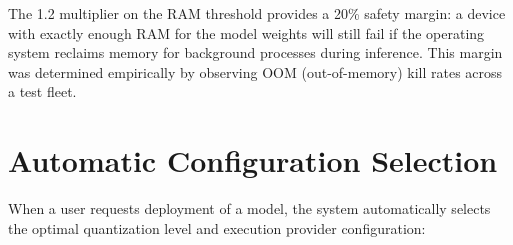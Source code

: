 \documentclass[12pt, letterpaper, twoside]{report}
\begin{document}
The 1.2 multiplier on the RAM threshold provides a 20\% safety margin: a device with exactly enough RAM for the model weights will still fail if the operating system reclaims memory for background processes during inference. This margin was determined empirically by observing OOM (out-of-memory) kill rates across a test fleet.

\section{Automatic Configuration Selection}
\label{sec:auto_config}

When a user requests deployment of a model, the system automatically selects the optimal quantization level and execution provider configuration:

\begin{figure}[H]
\centering
{}
\label{alg:auto_select}
\end{figure}
\end{document}
